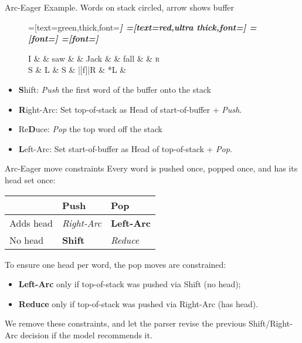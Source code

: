 \documentclass{lecture}
\begin{document}
\begin{plain}{Arc-Eager Example. Words on stack circled, arrow shows buffer}
\begin{figure}
    \centering
    \begin{dependency}[theme=simple]
    =[text=green,thick,font=\bfseries\itshape]
    =[text=red,ultra thick,font=\bfseries\itshape]
    =[font=\bfseries\itshape]
    =[font=\itshape]
    \begin{deptext}[column sep=.075cm, row sep=.1ex]
        I \&           \& saw \&          \& Jack       \& \& fall   \& \& \textsc{r} \\
        S   \& L \& S \& |[f]|R \& *L \&  \\ 
    \end{deptext}
\end{dependency}
\end{figure}
    \begin{itemize}
        \item \textbf{S}hift: \emph{Push} the first word of the buffer onto the stack
    \item \textbf{R}ight-Arc: Set top-of-stack as Head of start-of-buffer + \emph{Push}.
    \item Re\textbf{D}uce: \emph{Pop} the top word off the stack
    \item \textbf{L}eft-Arc: Set start-of-buffer as Head of top-of-stack + \emph{Pop}.
    \end{itemize}
\end{plain}

\begin{plain}{Arc-Eager move constraints}
Every word is pushed once, popped once, and has its head set once:
\begin{table}
    \centering
    \begin{tabular}{l|ll}
           & Push           & Pop \\
        \hline
Adds head  & \emph{Right-Arc}   & \textbf{Left-Arc}    \\
No head    & \textbf{Shift} & \emph{Reduce}    \\
\end{tabular}
\end{table}
To ensure one head per word, the pop moves are constrained:
\begin{itemize}
    \item \textbf{Left-Arc} only if top-of-stack was pushed via Shift (no head);
    \item \textbf{Reduce} only if top-of-stack was pushed via Right-Arc (has head).
\end{itemize}
We remove these constraints, and let the parser revise the previous Shift/Right-Arc
decision if the model recommends it.
\end{plain}
\end{document}
